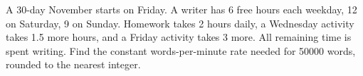 A 30-day November starts on Friday. A writer has 6 free hours each weekday, 12 on Saturday, 9 on Sunday. Homework takes 2 hours daily, a Wednesday activity takes 1.5 more hours, and a Friday activity takes 3 more. All remaining time is spent writing. Find the constant words-per-minute rate needed for 50000 words, rounded to the nearest integer.
